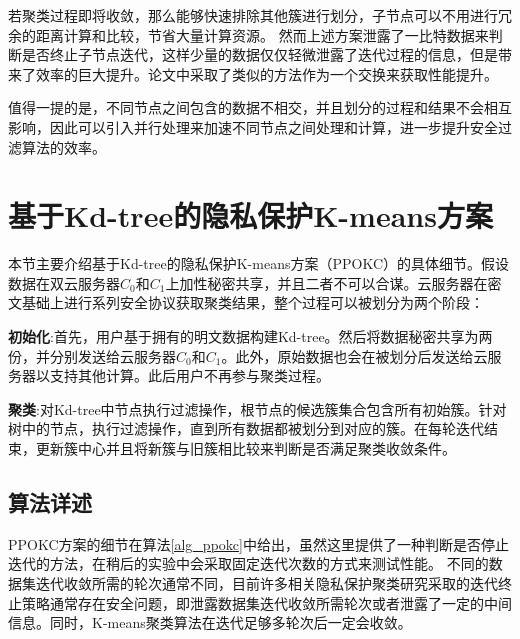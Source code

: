 若聚类过程即将收敛，那么能够快速排除其他簇进行划分，子节点可以不用进行冗余的距离计算和比较，节省大量计算资源。
然而上述方案泄露了一比特数据来判断是否终止子节点迭代，这样少量的数据仅仅轻微泄露了迭代过程的信息，但是带来了效率的巨大提升。论文\cite{bozdemir2021privacy,boldyreva2021privacy}中采取了类似的方法作为一个交换来获取性能提升。

值得一提的是，不同节点之间包含的数据不相交，并且划分的过程和结果不会相互影响，因此可以引入并行处理来加速不同节点之间处理和计算，进一步提升安全过滤算法的效率。

\section{基于Kd-tree的隐私保护K-means方案}
\label{s3-ppokc}
本节主要介绍基于Kd-tree的隐私保护K-means方案（PPOKC）的具体细节。假设数据在双云服务器$C_0$和$C_1$上加性秘密共享，并且二者不可以合谋。云服务器在密文基础上进行系列安全协议获取聚类结果，整个过程可以被划分为两个阶段：
\begin{compactitem}
	\item \textbf{初始化}:首先，用户基于拥有的明文数据构建Kd-tree。然后将数据秘密共享为两份，并分别发送给云服务器$C_0$和$C_1$。此外，原始数据也会在被划分后发送给云服务器以支持其他计算。此后用户不再参与聚类过程。
	\item \textbf{聚类}:对Kd-tree中节点执行过滤操作，根节点的候选簇集合包含所有初始簇。针对树中的节点，执行过滤操作，直到所有数据都被划分到对应的簇。在每轮迭代结束，更新簇中心并且将新簇与旧簇相比较来判断是否满足聚类收敛条件。
\end{compactitem}

\subsection{算法详述}
PPOKC方案的细节在算法\ref{alg_ppokc}中给出，虽然这里提供了一种判断是否停止迭代的方法，在稍后的实验中会采取固定迭代次数的方式来测试性能。
不同的数据集迭代收敛所需的轮次通常不同，目前许多相关隐私保护聚类研究采取的迭代终止策略通常存在安全问题，即泄露数据集迭代收敛所需轮次或者泄露了一定的中间信息。同时，K-means聚类算法在迭代足够多轮次后一定会收敛\cite{mohassel2019practical}。


